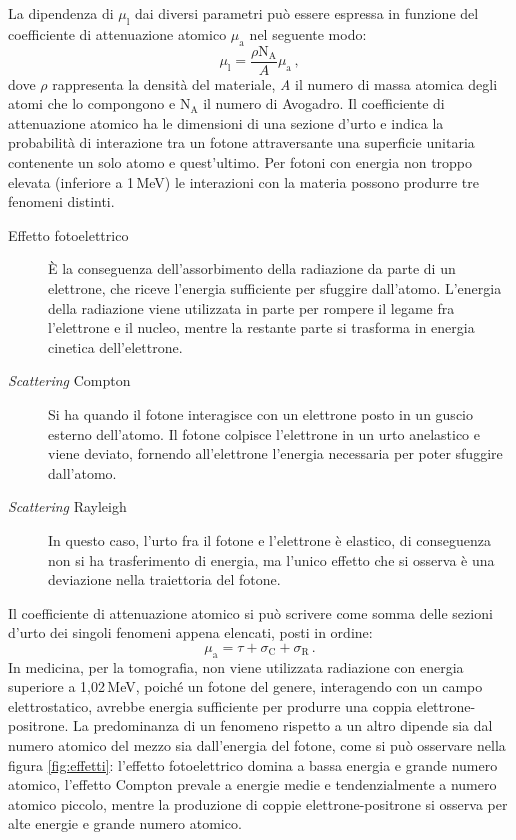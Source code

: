 \documentclass{report}
\newcommand{\figref}[1]{figura \ref{#1}}
\numberwithin{equation}{section}
\numberwithin{figure}{section}
\begin{document}
\noindent La dipendenza di $\mu_\mathrm{l}$ dai diversi parametri può essere espressa in funzione del coefficiente di attenuazione atomico $\mu_\mathrm{a}$ nel seguente modo:
\begin{equation}
    \mu_\mathrm{l} = \frac{\rho \mathrm{N_A}}{A} \mu_\mathrm{a}\,,
\end{equation}
dove $\rho$ rappresenta la densità del materiale, \textit{A} il numero di massa atomica degli atomi che lo compongono e $\mathrm{N_A}$ il numero di Avogadro. Il coefficiente di attenuazione atomico ha le dimensioni di una sezione d'urto e indica la probabilità di interazione tra un fotone attraversante una superficie unitaria contenente un solo atomo e quest'ultimo. Per fotoni con energia non troppo elevata (inferiore a 1\,MeV) le interazioni con la materia possono produrre tre fenomeni distinti.
\begin{description}
    \item[Effetto fotoelettrico] È la conseguenza dell'assorbimento della radiazione da parte di un elettrone, che riceve l'energia sufficiente per sfuggire dall'atomo. L'energia della radiazione viene utilizzata in parte per rompere il legame fra l'elettrone e il nucleo, mentre la restante parte si trasforma in energia cinetica dell'elettrone.
    \item[\textit{Scattering} Compton] Si ha quando il fotone interagisce con un elettrone posto in un guscio esterno dell'atomo. Il fotone colpisce l'elettrone in un urto anelastico e viene deviato, fornendo all'elettrone l'energia necessaria per poter sfuggire dall'atomo.
    \item[\textit{Scattering} Rayleigh] In questo caso, l'urto fra il fotone e l'elettrone è elastico, di conseguenza non si ha trasferimento di energia, ma l'unico effetto che si osserva è una deviazione nella traiettoria del fotone.
\end{description}
Il coefficiente di attenuazione atomico si può scrivere come somma delle sezioni d'urto dei singoli fenomeni appena elencati, posti in ordine:
\begin{equation}
    \mu_\mathrm{a} = \tau + \sigma_\mathrm{C} + \sigma_\mathrm{R}\,.
\end{equation}
In medicina, per la tomografia, non viene utilizzata radiazione con energia superiore a 1,02\,MeV, poiché un fotone del genere, interagendo con un campo elettrostatico, avrebbe energia sufficiente per produrre una coppia elettrone-positrone. La predominanza di un fenomeno rispetto a un altro dipende sia dal numero atomico del mezzo sia dall'energia del fotone, come si può osservare nella \figref{fig:effetti}: l'effetto fotoelettrico domina a bassa energia e grande numero atomico, l'effetto Compton prevale a energie medie e tendenzialmente a numero atomico piccolo, mentre la produzione di coppie elettrone-positrone si osserva per alte energie e grande numero atomico.
\end{document}
